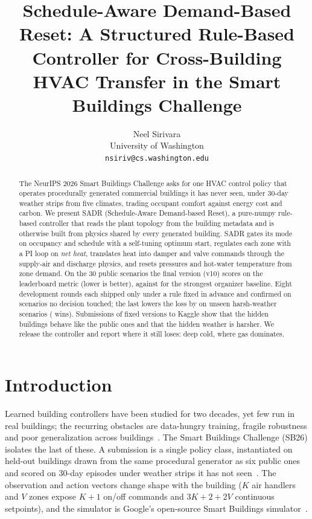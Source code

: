 \documentclass{article}
\title{Schedule-Aware Demand-Based Reset: A Structured Rule-Based Controller for Cross-Building HVAC Transfer in the Smart Buildings Challenge}
\author{%
  Neel Sirivara\\
  University of Washington\\
  \texttt{nsiriv@cs.washington.edu}
}
\begin{document}
\maketitle

\begin{abstract}
The NeurIPS 2026 Smart Buildings Challenge asks for one HVAC control policy that operates procedurally generated commercial buildings it has never seen, under 30-day weather strips from five climates, trading occupant comfort against energy cost and carbon. We present SADR (Schedule-Aware Demand-based Reset), a pure-numpy rule-based controller that reads the plant topology from the building metadata and is otherwise built from physics shared by every generated building. SADR gates its mode on occupancy and schedule with a self-tuning optimum start, regulates each zone with a PI loop on \emph{net heat}, translates heat into damper and valve commands through the supply-air and discharge physics, and resets pressures and hot-water temperature from zone demand. On the 30 public scenarios the final version (v10) scores \REigConfPubCand{} on the leaderboard metric (lower is better), against \MetricPidWater{} for the strongest organizer baseline. Eight development rounds each shipped only under a rule fixed in advance and confirmed on scenarios no decision touched; the last lowers the loss by \REigConfHarshCTwoRelAbs{} on \REigConfHarshCTwoN{} unseen harsh-weather scenarios (\REigConfHarshCTwoWins{} wins). Submissions of fixed versions to Kaggle show that the hidden buildings behave like the public ones and that the hidden weather is harsher. We release the controller and report where it still loses: deep cold, where gas dominates.
\end{abstract}

\section{Introduction}

Learned building controllers have been studied for two decades, yet few run in real buildings; the recurring obstacles are data-hungry training, fragile robustness and poor generalization across buildings~\citep{wang2020rl}. The Smart Buildings Challenge (SB26) isolates the last of these. A submission is a single policy class, instantiated on held-out buildings drawn from the same procedural generator as six public ones and scored on 30-day episodes under weather strips it has not seen~\citep{sb26kit}. The observation and action vectors change shape with the building ($K$ air handlers and $V$ zones expose $K{+}1$ on/off commands and $3K{+}2{+}2V$ continuous setpoints), and the simulator is Google's open-source Smart Buildings simulator~\citep{goldfeder2023lightweight,goldfeder2025suite}.
\end{document}
